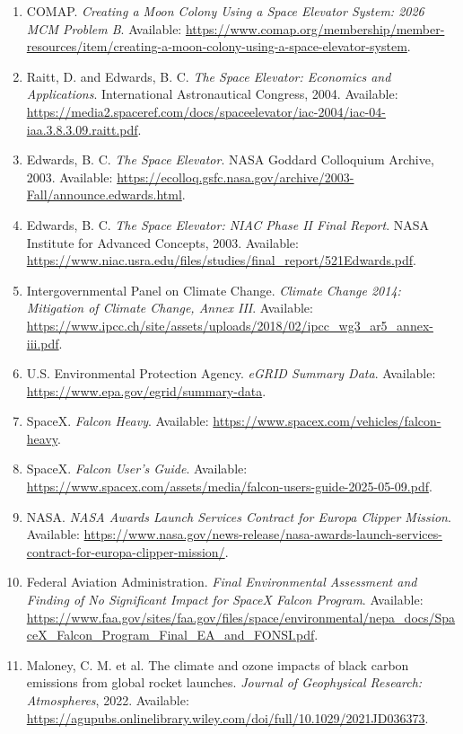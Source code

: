 \documentclass[12pt,a4paper,UTF8]{article}
\begin{document}
\begingroup
\footnotesize
\raggedright
\sloppy
\begin{enumerate}
    \item[{[1]}] COMAP. \textit{Creating a Moon Colony Using a Space Elevator System: 2026 MCM Problem B}. Available: \url{https://www.comap.org/membership/member-resources/item/creating-a-moon-colony-using-a-space-elevator-system}.
    \item[{[2]}] Raitt, D. and Edwards, B. C. \textit{The Space Elevator: Economics and Applications}. International Astronautical Congress, 2004. Available: \url{https://media2.spaceref.com/docs/spaceelevator/iac-2004/iac-04-iaa.3.8.3.09.raitt.pdf}.
    \item[{[3]}] Edwards, B. C. \textit{The Space Elevator}. NASA Goddard Colloquium Archive, 2003. Available: \url{https://ecolloq.gsfc.nasa.gov/archive/2003-Fall/announce.edwards.html}.
    \item[{[4]}] Edwards, B. C. \textit{The Space Elevator: NIAC Phase II Final Report}. NASA Institute for Advanced Concepts, 2003. Available: \url{https://www.niac.usra.edu/files/studies/final_report/521Edwards.pdf}.
    \item[{[5]}] Intergovernmental Panel on Climate Change. \textit{Climate Change 2014: Mitigation of Climate Change, Annex III}. Available: \url{https://www.ipcc.ch/site/assets/uploads/2018/02/ipcc_wg3_ar5_annex-iii.pdf}.
    \item[{[6]}] U.S. Environmental Protection Agency. \textit{eGRID Summary Data}. Available: \url{https://www.epa.gov/egrid/summary-data}.
    \item[{[7]}] SpaceX. \textit{Falcon Heavy}. Available: \url{https://www.spacex.com/vehicles/falcon-heavy}.
    \item[{[8]}] SpaceX. \textit{Falcon User's Guide}. Available: \url{https://www.spacex.com/assets/media/falcon-users-guide-2025-05-09.pdf}.
    \item[{[9]}] NASA. \textit{NASA Awards Launch Services Contract for Europa Clipper Mission}. Available: \url{https://www.nasa.gov/news-release/nasa-awards-launch-services-contract-for-europa-clipper-mission/}.
    \item[{[10]}] Federal Aviation Administration. \textit{Final Environmental Assessment and Finding of No Significant Impact for SpaceX Falcon Program}. Available: \url{https://www.faa.gov/sites/faa.gov/files/space/environmental/nepa_docs/SpaceX_Falcon_Program_Final_EA_and_FONSI.pdf}.
    \item[{[11]}] Maloney, C. M. et al. The climate and ozone impacts of black carbon emissions from global rocket launches. \textit{Journal of Geophysical Research: Atmospheres}, 2022. Available: \url{https://agupubs.onlinelibrary.wiley.com/doi/full/10.1029/2021JD036373}.

\end{enumerate}
\end{document}
